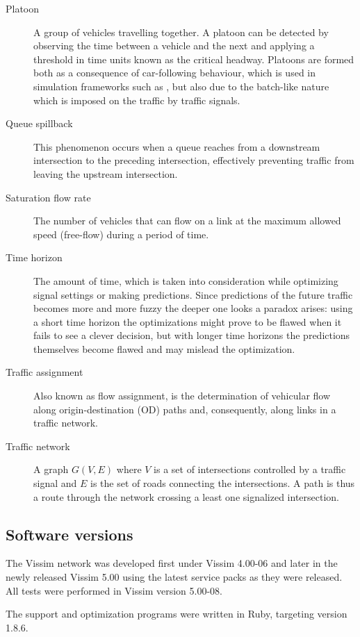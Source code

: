 \begin{description}
	\item[Platoon] A group of vehicles travelling together. A platoon can be detected by observing the time between a vehicle and the next and applying a threshold in time units known as the critical headway.
Platoons are formed both as a consequence of car-following behaviour, which is used in simulation frameworks such as \cite{treiber-2000-62}, but also due to the batch-like nature which is imposed on the traffic by traffic signals.

\item[Queue spillback] This phenomenon occurs when a queue reaches from a downstream intersection to the preceding intersection, effectively preventing traffic from leaving the upstream intersection.

\item[Saturation flow rate] The number of vehicles that can flow on a link at the maximum allowed speed (free-flow) during a period of time.

\item[Time horizon] The amount of time, which is taken into consideration while optimizing signal settings or making predictions. Since predictions of the future traffic becomes more and more fuzzy the deeper one looks a paradox arises: using a short time horizon the optimizations might prove to be flawed when it fails to see a clever decision, but with longer time horizons the predictions themselves become flawed and may mislead the optimization.

\item[Traffic assignment] Also known as flow assignment, is the determination of vehicular flow along origin-destination (OD) paths and, consequently, along links in a traffic network. 

\item[Traffic network] A graph $G(V,E)$ where $V$ is a set of intersections controlled by a traffic signal and $E$ is the set of roads connecting the intersections. A path is thus a route through the network crossing a least one signalized intersection.

\end{description}

\subsection{Software versions}
The Vissim network was developed first under Vissim 4.00-06 and later in the newly released Vissim 5.00 using the latest service packs as they were released. All tests were performed in Vissim version 5.00-08. 

The support and optimization programs were written in Ruby, targeting version 1.8.6.